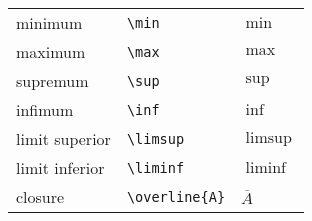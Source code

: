 \documentclass[10pt,landscape]{article}
\begin{document}
\begin{multicols}{3}
\begin{tabular}{lll}
        minimum                      & \verb!\min!                  & $\min$                                  \\
        maximum                      & \verb!\max!                  & $\max$                                  \\
        supremum                     & \verb!\sup!                  & $\sup$                                  \\
        infimum                      & \verb!\inf!                  & $\inf$                                  \\
        limit superior               & \verb!\limsup!               & $\limsup$                               \\
        limit inferior               & \verb!\liminf!               & $\liminf$                               \\
        closure                      & \verb!\overline{A}!          & $\overline{A}$
    \end{tabular}


\end{multicols}
\end{document}
